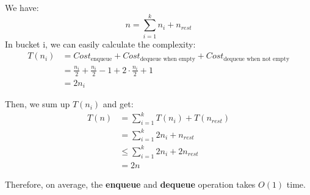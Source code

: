 \documentclass[12pt,a4paper]{article}
\makeatletter
\newtheorem*{solution}{Solution}
\theoremstyle{definition}
\renewenvironment{solution}[1][Solution] {\par\pushQED{\qed}\normalfont\topsep6\p@\@plus6\p@\relax\trivlist\item[\hskip\labelsep\bfseries#1\@addpunct{.}]\ignorespaces}{\popQED\endtrivlist\@endpefalse} \makeatother
\makeatother
\begin{document}
\begin{solution}
\begin{table}[ht]
\begin{tabular}{|c|c|c|c|c|c|}
		\end{tabular}
	\end{table}
	
	We have:
	$$
	n = \sum_{i=1}^k n_i + n_{rest}
	$$
	In bucket i,  we can easily calculate the complexity:
	\begin{align*}
			T(n_i) & = Cost_\text{enqueue} + Cost_\text{dequeue when empty} + Cost_\text{dequeue when not empty} \\
			& = \frac{n_i}{2} + \frac{n_i}{2} -1 + 2\cdot \frac{n_i}{2}+1 \\
			& = 2n_i
	\end{align*}
	
Then, we sum up $T(n_i)$ and get:
	\begin{align*}
	T(n) &= \sum_{i=1}^k T(n_i) + T(n_{rest}) \\
			&= \sum_{i=1}^k 2n_i + n_{rest} \\
			& \leq \sum_{i=1}^k 2n_i + 2 n_{rest}\\
			&= 2n	
	\end{align*}
	
	Therefore, on average, the \textbf{enqueue} and \textbf{dequeue} operation takes $O(1)$ time.
	
\end{solution}

\end{document}

